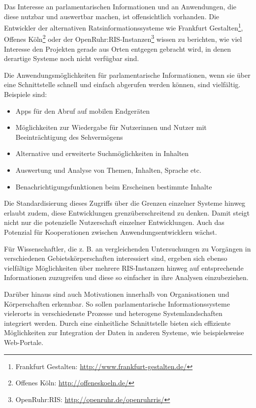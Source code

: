 \documentclass[,a4paper]{article}
\begin{document}
Das Interesse an parlamentarischen Informationen und an Anwendungen, die
diese nutzbar und auswertbar machen, ist offensichtlich vorhanden. Die
Entwickler der alternativen Ratsinformationssysteme wie Frankfurt
Gestalten\footnote{Frankfurt Gestalten:
  \url{http://www.frankfurt-gestalten.de/}}, Offenes Köln\footnote{Offenes
  Köln: \url{http://offeneskoeln.de/}} oder der
OpenRuhr:RIS-Instanzen\footnote{OpenRuhr:RIS:
  \url{http://openruhr.de/openruhrris/}} wissen zu berichten, wie viel
Interesse den Projekten gerade aus Orten entgegen gebracht wird, in
denen derartige Systeme noch nicht verfügbar sind.

Die Anwendungsmöglichkeiten für parlamentarische Informationen, wenn sie
über eine Schnittstelle schnell und einfach abgerufen werden können,
sind vielfältig. Beispiele sind:

\begin{itemize}
\itemsep1pt\parskip0pt
\item
  Apps für den Abruf auf mobilen Endgeräten
\item
  Möglichkeiten zur Wiedergabe für Nutzerinnen und Nutzer mit
  Beeinträchtigung des Sehvermögens
\item
  Alternative und erweiterte Suchmöglichkeiten in Inhalten
\item
  Auswertung und Analyse von Themen, Inhalten, Sprache etc.
\item
  Benachrichtigungsfunktionen beim Erscheinen bestimmte Inhalte
\end{itemize}

Die Standardisierung dieses Zugriffs über die Grenzen einzelner Systeme
hinweg erlaubt zudem, diese Entwicklungen grenzüberschreitend zu denken.
Damit steigt nicht nur die potenzielle Nutzerschaft einzelner
Entwicklungen. Auch das Potenzial für Kooperationen zwischen
Anwendungsentwicklern wächst.

Für Wissenschaftler, die z. B. an vergleichenden Untersuchungen zu
Vorgängen in verschiedenen Gebietskörperschaften interessiert sind,
ergeben sich ebenso vielfältige Möglichkeiten über mehrere RIS-Instanzen
hinweg auf entsprechende Informationen zuzugreifen und diese so
einfacher in ihre Analysen einzubeziehen.

Darüber hinaus sind auch Motivationen innerhalb von Organisationen und
Körperschaften erkennbar. So sollen parlamentarische Informationssysteme
vielerorts in verschiedenste Prozesse und heterogene Systemlandschaften
integriert werden. Durch eine einheitliche Schnittstelle bieten sich
effiziente Möglichkeiten zur Integration der Daten in anderen Systeme,
wie beispielsweise Web-Portale.
\end{document}
